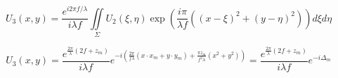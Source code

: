 \documentclass{kepfl}
\begin{document}
\begin{equation}
{U_3}(x,y) = \frac{{{e^{i2\pi f/\lambda }}}}{{i\lambda f}}\iint\limits_\Sigma  {{U_2}(\xi ,\eta )\exp \left( {\frac{{i\pi }}{{\lambda f}}\left( {{{(x - \xi )}^2} + {{(y - \eta )}^2}} \right)} \right)d\xi d\eta }
\end{equation}

\begin{equation}
{U_3}(x,y) = \frac{{{e^{\frac{{2\pi }}{\lambda }\left( {2f + {z_m}} \right)}}}}{{i\lambda f}}{e^{ - i\left( {\frac{{2\pi }}{{f\lambda }}(x \cdot {x_m} + y \cdot {y_m}) + \frac{{\pi {z_m}}}{{{f^2}\lambda }}({x^2} + {y^2})} \right)}} = \frac{{{e^{\frac{{2\pi }}{\lambda }\left( {2f + {z_m}} \right)}}}}{{i\lambda f}}{e^{ - i{\Delta _m}}}
\end{equation}
\end{document}

